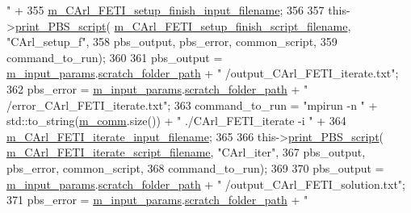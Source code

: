 \begin{DoxyCode}
{       "} +
355                             \hyperlink{classcarl_1_1_solver___files___setup_a24d691377ccdddf6fe29e3025bc53c13}{m\_CArl\_FETI\_setup\_finish\_input\_filename};
356 
357         this->\hyperlink{classcarl_1_1_solver___files___setup_a75c99aedd9396118e908379bb975ddac}{print\_PBS\_script}( 
      \hyperlink{classcarl_1_1_solver___files___setup_a74f8cd1404471542269a1cc9aa8c8d84}{m\_CArl\_FETI\_setup\_finish\_script\_filename}, \textcolor{stringliteral}{"CArl\_setup\_f"},
358                             pbs\_output, pbs\_error, common\_script,
359                             command\_to\_run);
360         
361         pbs\_output = \hyperlink{classcarl_1_1_solver___files___setup_aa5804bf6c6e506b382766333f232d3d5}{m\_input\_params}.\hyperlink{structcarl_1_1feti__setup__init__params_a57e553748427905076bae85d239f9537}{scratch\_folder\_path} + \textcolor{stringliteral}{"
      /output\_CArl\_FETI\_iterate.txt"};
362         pbs\_error  = \hyperlink{classcarl_1_1_solver___files___setup_aa5804bf6c6e506b382766333f232d3d5}{m\_input\_params}.\hyperlink{structcarl_1_1feti__setup__init__params_a57e553748427905076bae85d239f9537}{scratch\_folder\_path} + \textcolor{stringliteral}{"
      /error\_CArl\_FETI\_iterate.txt"};
363         command\_to\_run = \textcolor{stringliteral}{"mpirun -n "} + std::to\_string(\hyperlink{classcarl_1_1_solver___files___setup_aa8049195d5e383a0ca4295795e3f5751}{m\_comm}.size()) + \textcolor{stringliteral}{" ./CArl\_FETI\_iterate -i "} +
364                             \hyperlink{classcarl_1_1_solver___files___setup_a2e7e17a2974bf14101e4a2e37cc893fb}{m\_CArl\_FETI\_iterate\_input\_filename};
365 
366         this->\hyperlink{classcarl_1_1_solver___files___setup_a75c99aedd9396118e908379bb975ddac}{print\_PBS\_script}( 
      \hyperlink{classcarl_1_1_solver___files___setup_a9ce875697a888d84dbd186f74e64cd6a}{m\_CArl\_FETI\_iterate\_script\_filename}, \textcolor{stringliteral}{"CArl\_iter"},
367                             pbs\_output, pbs\_error, common\_script,
368                             command\_to\_run);
369 
370         pbs\_output = \hyperlink{classcarl_1_1_solver___files___setup_aa5804bf6c6e506b382766333f232d3d5}{m\_input\_params}.\hyperlink{structcarl_1_1feti__setup__init__params_a57e553748427905076bae85d239f9537}{scratch\_folder\_path} + \textcolor{stringliteral}{"
      /output\_CArl\_FETI\_solution.txt"};
371         pbs\_error  = \hyperlink{classcarl_1_1_solver___files___setup_aa5804bf6c6e506b382766333f232d3d5}{m\_input\_params}.\hyperlink{structcarl_1_1feti__setup__init__params_a57e553748427905076bae85d239f9537}{scratch\_folder\_path} + \textcolor{stringliteral}{"
}
\end{DoxyCode}
